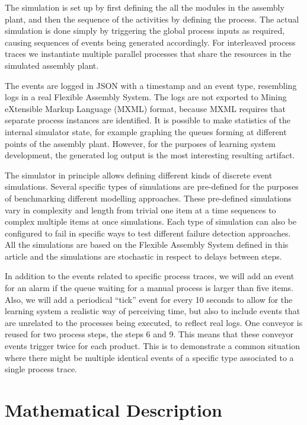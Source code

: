 \documentclass[journal]{IEEEtran}
\begin{document}
The simulation is set up by first defining the all the modules in the assembly plant, and then the sequence of the activities by defining the process. The actual simulation
is done simply by triggering the global process inputs as required, causing sequences of events being generated accordingly. For interleaved process traces we instantiate multiple
parallel processes that share the resources in the simulated assembly plant.

The events are logged in JSON with a timestamp and an event type, resembling logs in a real Flexible Assembly System. The logs are not exported to
Mining eXtensible Markup Language (MXML) format, because MXML requires that separate process instances are identified. It is possible to make statistics of the internal simulator
state, for example graphing the queues forming at different points of the assembly plant. However, for the purposes of learning system development, the generated log output is the most
interesting resulting artifact.

The simulator in principle allows defining different kinds of discrete event simulations. Several specific types of simulations are pre-defined for the purposes of benchmarking
different modelling approaches. These pre-defined simulations vary in complexity and length from trivial one item at a time sequences to complex multiple items at once simulations.
Each type of simulation can also be configured to fail in specific ways to test different failure detection approaches. All the simulations are based on the Flexible Assembly System
defined in this article and the simulations are stochastic in respect to delays between steps.

In addition to the events related to specific process traces, we will add an event for an alarm if the queue waiting for a manual process is larger than five items. Also, we will
add a periodical ``tick'' event for every 10 seconds to allow for the learning system a realistic way of perceiving time, but also to include events that are unrelated to
the processes being executed, to reflect real logs. One conveyor is reused for two process steps, the steps 6 and 9. This means that these conveyor events
trigger twice for each product. This is to demonstrate a common situation where there might be multiple identical events of a specific type
associated to a single process trace.

\section{Mathematical Description}
\end{document}
